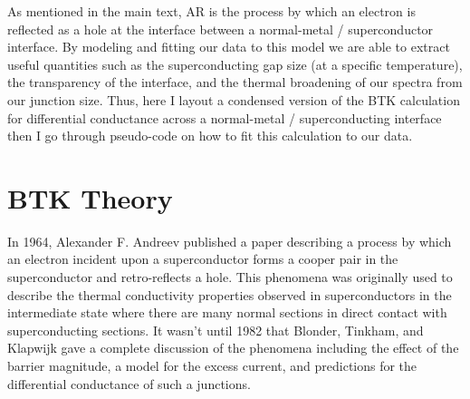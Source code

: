 As mentioned in the main text, \acl{AR} is the process by which an electron is reflected as a hole at the interface between a normal-metal / superconductor interface. By modeling and fitting our data to this model we are able to extract useful quantities such as the superconducting gap size (at a specific temperature), the transparency of the interface, and the thermal broadening of our spectra from our junction size. Thus, here I layout a condensed version of the \ac{BTK} calculation for differential conductance across a normal-metal / superconducting interface then I go through pseudo-code on how to fit this calculation to our data.

\section{BTK Theory}
In 1964, Alexander F. Andreev published a paper describing a process by which an electron incident upon a superconductor forms a cooper pair in the superconductor and retro-reflects a hole\cite{Andreev1964}. This phenomena was originally used to describe the thermal conductivity properties observed in superconductors in the intermediate state where there are many normal sections in direct contact with superconducting sections. It wasn't until 1982 that Blonder, Tinkham, and Klapwijk gave a complete discussion of the phenomena including the effect of the barrier magnitude, a model for the excess current, and predictions for the differential conductance of such a junctions\cite{BTK}.\par

